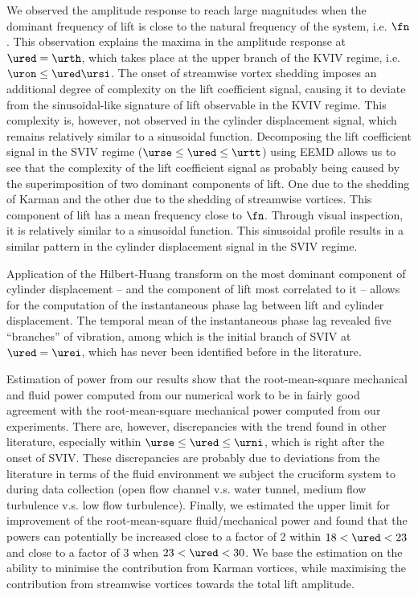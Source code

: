 \documentclass[a4paper,fleqn]{cas-sc}
\begin{document}
We observed the amplitude response to reach large magnitudes when the dominant frequency of lift is close to the natural frequency of the system, i.e. $\fn$. This observation explains the maxima in the amplitude response at $\ured = \urth$, which takes place at the upper branch of the KVIV regime, i.e. $\uron \leq \ured \ursi$. The onset of streamwise vortex shedding imposes an additional degree of complexity on the lift coefficient signal, causing it to deviate from the sinusoidal-like signature of lift observable in the KVIV regime. This complexity is, however, not observed in the cylinder displacement signal, which remains relatively similar to a sinusoidal function. Decomposing the lift coefficient signal in the SVIV regime ($\urse \leq \ured \leq \urtt$) using EEMD allows us to see that the complexity of the lift coefficient signal as probably being caused by the superimposition of two dominant components of lift. One due to the shedding of Karman and the other due to the shedding of streamwise vortices. This component of lift has a mean frequency close to $\fn$. Through visual inspection, it is relatively similar to a sinusoidal function. This sinusoidal profile results in a similar pattern in the cylinder displacement signal in the SVIV regime.

Application of the Hilbert-Huang transform on the most dominant component of cylinder displacement -- and the component of lift most correlated to it -- allows for the computation of the instantaneous phase lag between lift and cylinder displacement. The temporal mean of the instantaneous phase lag revealed five ``branches'' of vibration, among which is the initial branch of SVIV at $\ured = \urei$, which has never been identified before in the literature.

Estimation of power from our results show that the root-mean-square mechanical and fluid power computed from our numerical work to be in fairly good agreement with the root-mean-square mechanical power computed from our experiments. There are, however, discrepancies with the trend found in other literature, especially within $\urse \leq \ured \leq \urni$, which is right after the onset of SVIV. These discrepancies are probably due to deviations from the literature in terms of the fluid environment we subject the cruciform system to during data collection (open flow channel v.s. water tunnel, medium flow turbulence v.s. low flow turbulence). Finally, we estimated the upper limit for improvement of the root-mean-square fluid/mechanical power and found that the \rms{} powers can potentially be increased close to a factor of 2 within $18 < \ured < 23$ and close to a factor of 3 when $23 < \ured < 30$. We base the estimation on the ability to minimise the contribution from Karman vortices, while maximising the contribution from streamwise vortices towards the total \rms{} lift amplitude.
\end{document}
